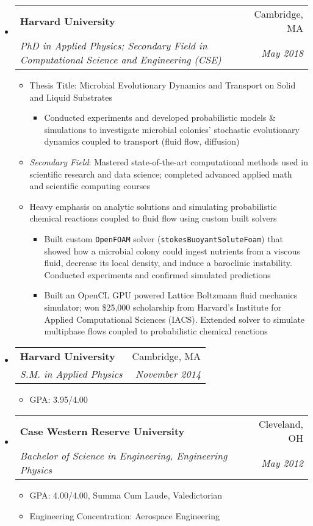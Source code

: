\documentclass[letterpaper,11pt]{article}
\makeatletter
\newcommand{\resitem}[1]{\item #1 \vspace{-2pt}}
\newcommand{\ressubheading}[4]{\vspace{-14pt}
\begin{tabular*}{7.0in}{l@{\extracolsep{\fill}}r}
                \\
                \textbf{#1} & #2 \\
                \textit{#3} & \textit{#4} \\
\end{tabular*}\vspace{-6pt}}
\makeatother
\begin{document}
\begin{itemize}
\item \ressubheading{Harvard University}{Cambridge, MA}{PhD in Applied Physics; Secondary Field in Computational Science and Engineering (CSE)}{May 2018}     
\begin{itemize}
\resitem{Thesis Title: Microbial Evolutionary Dynamics and
Transport on Solid and Liquid Substrates}

\begin{itemize}
\resitem{Conducted experiments and developed probabilistic models \& simulations to investigate microbial colonies' stochastic evolutionary dynamics coupled to transport (fluid flow, diffusion)}
\end{itemize}

\resitem{\textit{Secondary Field}: Mastered state-of-the-art computational methods used in scientific research and data science; completed advanced applied math and scientific computing courses} 

\resitem{Heavy emphasis on analytic solutions and simulating probabilistic chemical reactions coupled to fluid flow using custom built solvers}

\begin{itemize}
\resitem{Built custom \texttt{OpenFOAM} solver (\texttt{stokesBuoyantSoluteFoam}) that showed how a microbial colony could ingest nutrients from a viscous fluid, decrease its local density, and induce a baroclinic instability. Conducted experiments and confirmed simulated predictions}
\resitem{Built an OpenCL GPU powered Lattice Boltzmann fluid mechanics simulator; won \$25,000 scholarship from Harvard's Institute for Applied Computational Sciences (IACS). Extended solver to simulate multiphase flows coupled to probabilistic chemical reactions}
\end{itemize}

\end{itemize} 
              
\item \ressubheading{Harvard University}{Cambridge, MA}{S.M. in Applied Physics}{November 2014}
        \begin{itemize}
        \resitem{GPA: 3.95/4.00}
        \end{itemize}
\item
        \ressubheading{Case Western Reserve University}{Cleveland, OH}{Bachelor of Science in Engineering, Engineering Physics}{May 2012}
        \begin{itemize}
                \resitem{GPA: 4.00/4.00, Summa Cum Laude, Valedictorian }
                \resitem{Engineering Concentration: Aerospace Engineering}
        \end{itemize}
\end{itemize}
\end{document}
